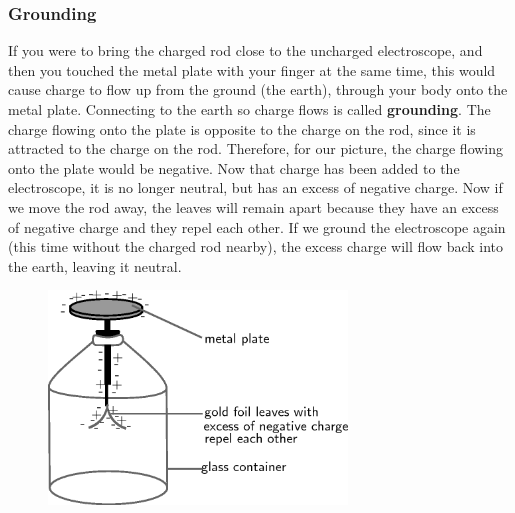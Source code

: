             \subsubsection{ Grounding}
            \nopagebreak
            
          
          \label{m38781*id200585}If you were to bring the charged rod close to the uncharged electroscope, and then you touched the metal plate with your finger at the same time, this would cause charge to flow up from the ground (the earth), through your body onto the metal plate. Connecting to the earth so charge flows is called \textbf{grounding}. The charge flowing onto the plate is opposite to the charge on the rod, since it is attracted to the charge on the rod. Therefore, for our picture, the charge flowing onto the plate would be negative. Now that charge has been added to the electroscope, it is no longer neutral, but has an excess of negative charge. Now if we move the rod away, the leaves will remain apart because they have an excess of negative charge and they repel each other. If we ground the electroscope again (this time without the charged rod nearby), the excess charge will flow back into the earth, leaving it neutral.\par 
          \label{m38781*id200601}
    \setcounter{subfigure}{0}


	\begin{figure}[H] %
    \begin{center}
    \label{m38781*id200605!!!underscore!!!media}\label{m38781*id200605!!!underscore!!!printimage}\includegraphics[width=300px]{col11305.imgs/m38781_PG10C8_010.png} %
        
      \vspace{2pt}
    \vspace{.1in}
    
    \end{center}

 \end{figure}   

